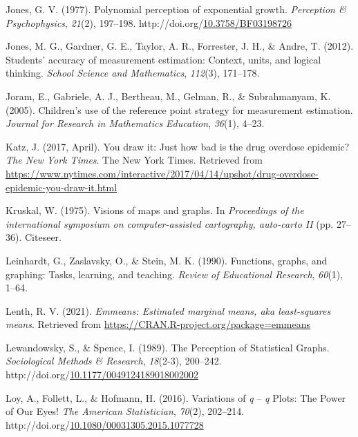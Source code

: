 \documentclass[print]{nuthesis}
\newlength{\cslhangindent}
\newenvironment{CSLReferences}%
{\setlength{\parindent}{0pt}%
\everypar{\setlength{\hangindent}{\cslhangindent}}\ignorespaces}%
{\par}
\begin{document}
\begin{CSLReferences}{1}{0}
\leavevmode{}%
Jones, G. V. (1977). Polynomial perception of exponential growth. \emph{Perception \& Psychophysics}, \emph{21}(2), 197--198. http://doi.org/\href{https://doi.org/10.3758/BF03198726}{10.3758/BF03198726}

\leavevmode{}%
Jones, M. G., Gardner, G. E., Taylor, A. R., Forrester, J. H., \& Andre, T. (2012). Students' accuracy of measurement estimation: Context, units, and logical thinking. \emph{School Science and Mathematics}, \emph{112}(3), 171--178.

\leavevmode{}%
Joram, E., Gabriele, A. J., Bertheau, M., Gelman, R., \& Subrahmanyam, K. (2005). Children's use of the reference point strategy for measurement estimation. \emph{Journal for Research in Mathematics Education}, \emph{36}(1), 4--23.

\leavevmode{}%
Katz, J. (2017, April). You draw it: Just how bad is the drug overdose epidemic? \emph{The New York Times}. The New York Times. Retrieved from \url{https://www.nytimes.com/interactive/2017/04/14/upshot/drug-overdose-epidemic-you-draw-it.html}

\leavevmode{}%
Kruskal, W. (1975). Visions of maps and graphs. In \emph{Proceedings of the international symposium on computer-assisted cartography, auto-carto II} (pp. 27--36). Citeseer.

\leavevmode{}%
Leinhardt, G., Zaslavsky, O., \& Stein, M. K. (1990). Functions, graphs, and graphing: Tasks, learning, and teaching. \emph{Review of Educational Research}, \emph{60}(1), 1--64.

\leavevmode{}%
Lenth, R. V. (2021). \emph{Emmeans: Estimated marginal means, aka least-squares means}. Retrieved from \url{https://CRAN.R-project.org/package=emmeans}

\leavevmode{}%
Lewandowsky, S., \& Spence, I. (1989). The {Perception} of {Statistical} {Graphs}. \emph{Sociological Methods \& Research}, \emph{18}(2-3), 200--242. http://doi.org/\href{https://doi.org/10.1177/0049124189018002002}{10.1177/0049124189018002002}

\leavevmode{}%
Loy, A., Follett, L., \& Hofmann, H. (2016). Variations of \emph{q} -- \emph{q} {Plots}: {The} {Power} of {Our} {Eyes}! \emph{The American Statistician}, \emph{70}(2), 202--214. http://doi.org/\href{https://doi.org/10.1080/00031305.2015.1077728}{10.1080/00031305.2015.1077728}


\end{CSLReferences}
\end{document}
